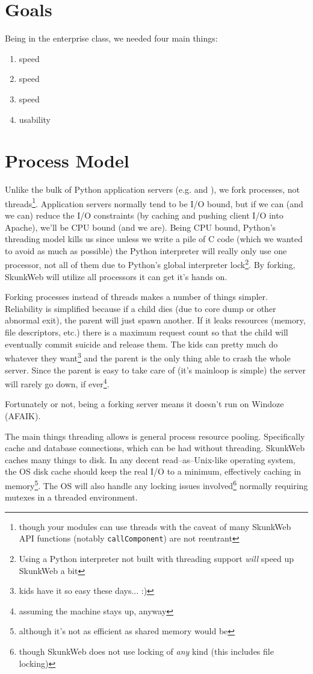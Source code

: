 \documentclass[twocolumn]{article}
\begin{document}
\section{Goals}
Being in the enterprise class, we needed four main things:
\begin{enumerate}
\item speed
\item speed
\item speed
\item usability
\end{enumerate}

\section{Process Model}
Unlike the bulk of Python application servers (e.g. \cite{zope} and
\cite{pywx}), we fork processes, not threads\footnote{though your
modules can use threads with the caveat of many SkunkWeb API
functions (notably \texttt{callComponent}) are not reentrant}.
Application servers normally tend to be I/O bound, but if we can (and
we can) reduce the I/O constraints (by caching and pushing client I/O
into Apache), we'll be CPU bound (and we are).  Being CPU bound,
Python's threading model kills us since unless we write a pile of C
code (which we wanted to avoid as much as possible) the Python
interpreter will really only use one processor, not all of them due to
Python's global interpreter lock\footnote{Using a Python interpreter
not built with threading support \emph{will} speed up SkunkWeb
a bit}.  By forking, SkunkWeb will utilize all processors it can get
it's hands on.

Forking processes instead of threads makes a number of things simpler.
Reliability is simplified because if a child dies (due to core dump or
other abnormal exit), the parent will just spawn another.  If it
leaks resources (memory, file descriptors, etc.) there is a maximum
request count so that the child will eventually commit suicide and
release them.  The kids can pretty much do whatever they
want\footnote{kids have it so easy these days... :)} and the parent is
the only thing able to crash the whole server.  Since the parent is
easy to take care of (it's mainloop is simple) the server will rarely
go down, if ever\footnote{assuming the machine stays up, anyway}.

Fortunately or not, being a forking server means it doesn't run on
Windoze (AFAIK).  

The main things threading allows is general process resource pooling.
Specifically cache and database connections, which can be had without
threading.  SkunkWeb caches many things to disk. In any decent
read--as--Unix-like operating system, the OS disk cache should keep
the real I/O to a minimum, effectively caching in
memory\footnote{although it's not as efficient as shared memory would
be}.  The OS will also handle any locking issues
involved\footnote{though SkunkWeb does not use locking of \emph{any}
kind (this includes file locking)} normally requiring mutexes in a
threaded environment.
\end{document}
